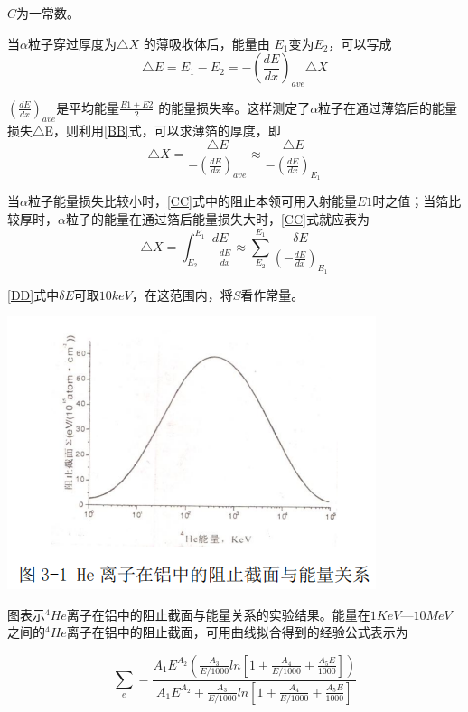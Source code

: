 \documentclass[hyperref]{ctexart}
\begin{document}
\begin{multicols}{2}
	$C$为一常数。

	当$\alpha$粒子穿过厚度为$\triangle X$ 的薄吸收体后，能量由 $E_1$变为$ E_2$，可以写成
	\begin{equation}\label{BB}
	\triangle E=E_1-E_2=-(\frac{dE}{dx})_{ave}\triangle X 
	\end{equation}

	$(\frac{dE}{dx})_{ave}$是平均能量$\frac{E1+E2}{2}$ 的能量损失率。这样测定了$\alpha$粒子在通过薄箔后的能量损失$\triangle$E，则利用\eqref{BB}式，可以求薄箔的厚度，即
	\begin{equation}\label{CC}
	\triangle X=\frac{\triangle E}{-(\frac{dE}{dx})_{ave}} \approx \frac{\triangle E}{-(\frac{dE}{dx})_{E_1}}
	\end{equation}

	当$\alpha$粒子能量损失比较小时，\eqref{CC}式中的阻止本领可用入射能量$E1$时之值；当箔比较厚时，$\alpha$粒子的能量在通过箔后能量损失大时，\eqref{CC}式就应表为
	\begin{equation}\label{DD}
	\triangle X=\int^{E_1}_{E_2}\frac{dE}{-\frac{dE}{dx}}\approx \sum^{E_1}_{E_2}\frac{\delta E}{(-\frac{dE}{dx})_{E_1}}
	\end{equation}
	
	\eqref{DD}式中$\delta E$可取$10keV$，在这范围内，将$S$看作常量。

	\begin{center}\includegraphics[scale=0.5]{HeAl.png}\end{center}
	图表示$^{4}He$离子在铝中的阻止截面与能量关系的实验结果。能量在$1KeV —10MeV$之间的$^{4}He$离子在铝中的阻止截面，可用曲线拟合得到的经验公式表示为

	\begin{equation}
	{\sum}_e=\frac{A_1E^{A_2}(\frac{A_3}{E/1000}ln[1+\frac{A_4}{E/1000}+\frac{A_5E}{1000}])}{A_1E^{A_2}+\frac{A_3}{E/1000}ln[1+\frac{A_4}{E/1000}+\frac{A_5E}{1000}]}\label{chang}
	\end{equation}


\end{multicols}
\end{document}
